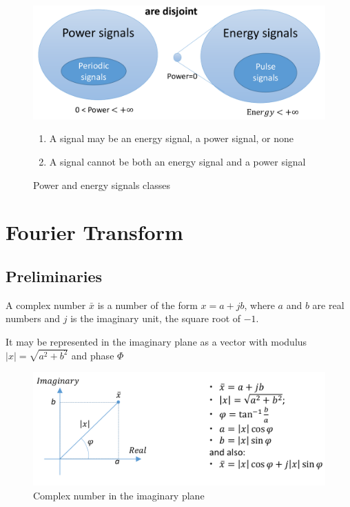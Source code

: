 \begin{figure}[htbp]
   \centering
   \includegraphics{images/powerenergy_signals.png}
   \caption{Power and energy signals classes}
   \begin{enumerate}
      \item 
      A signal may be an energy signal, a power signal, or none
      \item A signal cannot be both an energy signal and a power signal
   \end{enumerate}
      \label{fig:powerenergy_signals}
\end{figure}

\section{Fourier Transform}
\subsection{Preliminaries}
\begin{definition}
   A complex number $\bar{x}$ is a number of the form $x = a + jb$, where $a$ and $b$ are real numbers and $j$ is the imaginary unit, the square root of $-1$.

   It may be represented in the imaginary plane as a vector with modulus $|x| = \sqrt{a^2 + b^2}$ and phase $\Phi$

   \begin{figure}[htbp]
      \centering
      \includegraphics{images/complex_vector.png}
      \caption{Complex number in the imaginary plane}
      \label{fig:complex_vector}
   \end{figure}
\end{definition}

